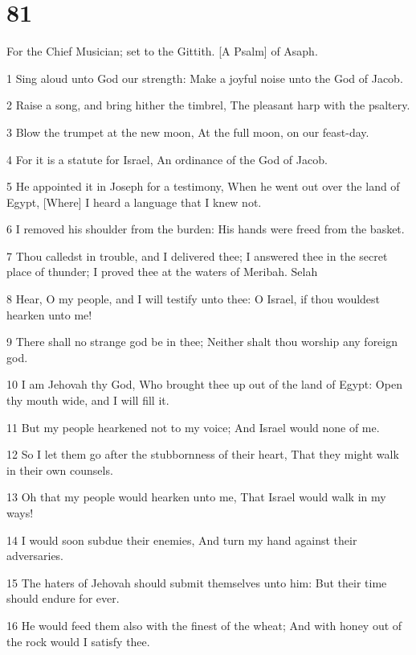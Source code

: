 \chapter{81}

\par For the Chief Musician; set to the Gittith. [A Psalm] of Asaph.

\par 1 Sing aloud unto God our strength: Make a joyful noise unto the God of Jacob.
\par 2 Raise a song, and bring hither the timbrel, The pleasant harp with the psaltery.
\par 3 Blow the trumpet at the new moon, At the full moon, on our feast-day.
\par 4 For it is a statute for Israel, An ordinance of the God of Jacob.
\par 5 He appointed it in Joseph for a testimony, When he went out over the land of Egypt, [Where] I heard a language that I knew not.
\par 6 I removed his shoulder from the burden: His hands were freed from the basket.
\par 7 Thou calledst in trouble, and I delivered thee; I answered thee in the secret place of thunder; I proved thee at the waters of Meribah. Selah
\par 8 Hear, O my people, and I will testify unto thee: O Israel, if thou wouldest hearken unto me!
\par 9 There shall no strange god be in thee; Neither shalt thou worship any foreign god.
\par 10 I am Jehovah thy God, Who brought thee up out of the land of Egypt: Open thy mouth wide, and I will fill it.
\par 11 But my people hearkened not to my voice; And Israel would none of me.
\par 12 So I let them go after the stubbornness of their heart, That they might walk in their own counsels.
\par 13 Oh that my people would hearken unto me, That Israel would walk in my ways!
\par 14 I would soon subdue their enemies, And turn my hand against their adversaries.
\par 15 The haters of Jehovah should submit themselves unto him: But their time should endure for ever.
\par 16 He would feed them also with the finest of the wheat; And with honey out of the rock would I satisfy thee.

